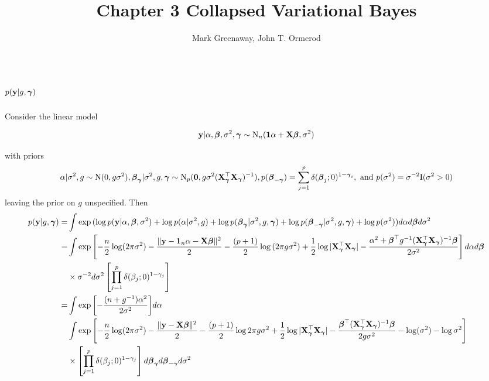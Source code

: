 \documentclass{amsart}[12pt]
\title{Chapter 3 Collapsed Variational Bayes}
\author{Mark Greenaway, John T. Ormerod}
\theoremstyle{definition}
\begin{document}
\section{$p({\bf y} | g, {\boldsymbol \gamma})$}
\noindent Consider the linear model

\[
	{\bf y} | \alpha, {\boldsymbol \beta}, \sigma^2, {\boldsymbol \gamma} \sim \text{N}_n({\bf 1} \alpha + {\bf X} {\boldsymbol \beta}, \sigma^2)
\]

\noindent with priors
\[
	\alpha | \sigma^2, g \sim \text{N}(0, g \sigma^2),
	{\boldsymbol \beta}_{\boldsymbol \gamma} | \sigma^2, g, {\boldsymbol \gamma} \sim \text{N}_p({\bf 0}, g \sigma^2 ({\bf X}_{\boldsymbol \gamma}^\top {\bf X}_{\boldsymbol \gamma})^{-1}),
	p({\boldsymbol \beta}_{-{\boldsymbol \gamma}}) = \sum_{j=1}^p \delta({\boldsymbol \beta}_j; 0)^{1 - {\boldsymbol \gamma}_i}, \text{ and }
	p(\sigma^2) = \sigma^{-2} \text{I}(\sigma^2 > 0)
\]
leaving the prior on $g$ unspecified. Then
\begin{align*}
	p({\bf y} | g, {\boldsymbol \gamma}) =& \int \exp{(\log p({\bf y}| \alpha, {\boldsymbol\beta}, \sigma^2) + \log p(\alpha | \sigma^2, g)
														+ \log p({\boldsymbol\beta}_{\boldsymbol\gamma}| \sigma^2, g, {\boldsymbol\gamma}) + \log p({\boldsymbol\beta}_{-{\boldsymbol\gamma}} | \sigma^2, g, {\boldsymbol\gamma}) + \log p(\sigma^2))} d \alpha d {\boldsymbol \beta} d \sigma^2 \\
		=& \int \exp{\left[-\frac{n}{2} \log (2 \pi \sigma^2) - \frac{\|{\bf y}- {\bf1}_n \alpha - {\bf X}{\boldsymbol\beta}\|^2}{2} 
		-\frac{(p + 1)}{2} \log{(2\pi g \sigma^2)} + \frac{1}{2} \log{|{\bf X}_{\boldsymbol\gamma}^\top {\bf X}_{\boldsymbol\gamma}|} - \frac{\alpha^2 + {\boldsymbol\beta}^\top g^{-1} ({\bf X}_{\boldsymbol\gamma}^\top {\bf X}_{\boldsymbol\gamma})^{-1} {\boldsymbol\beta}}{2 \sigma^{2}} \right] d \alpha d {\boldsymbol\beta}} \\
		&\times \sigma^{-2} d \sigma^2 \left[ \prod_{j=1}^p \delta(\beta_j; 0)^{1 - \gamma_j} \right] \\
		=& \int \exp{\left[ -\frac{(n + g^{-1}) \alpha^2}{2 \sigma^2} \right]} d \alpha \\
		&  \int \exp{\left[-\frac{n}{2} \log (2 \pi \sigma^2) - \frac{\|{\bf y}- {\bf X}{\boldsymbol\beta}\|^2}{2} 
		-\frac{(p + 1)}{2} \log{2\pi g \sigma^2} + \frac{1}{2} \log{|{\bf X}_{\boldsymbol\gamma}^\top {\bf X}_{\boldsymbol\gamma}|} - \frac{{\boldsymbol\beta}^\top ({\bf X}_{\boldsymbol\gamma}^\top {\bf X}_{\boldsymbol\gamma})^{-1} {\boldsymbol\beta}}{2 g \sigma^{2}} - \log(\sigma^2) -\log \sigma^2 \right]}  \\
		&\times \left[ \prod_{j=1}^p \delta(\beta_j; 0)^{1 - \gamma_j} \right] d {\boldsymbol \beta}_{\boldsymbol \gamma} d {\boldsymbol \beta}_{-{\boldsymbol \gamma}} d \sigma^2
\end{align*}
\end{document}
